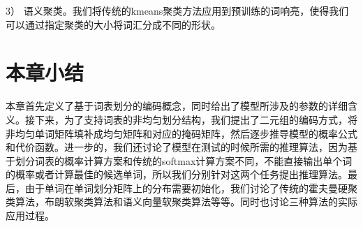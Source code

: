 3） 语义聚类。我们将传统的kmeans聚类方法应用到预训练的词响亮，使得我们可以通过指定聚类的大小将词汇分成不同的形状。

\section{本章小结}
本章首先定义了基于词表划分的编码概念，同时给出了模型所涉及的参数的详细含义。接下来，为了支持词表的非均匀划分结构，我们提出了二元组的编码方式，将非均匀单词矩阵填补成均匀矩阵和对应的掩码矩阵，然后逐步推导模型的概率公式和代价函数。进一步的，我们还讨论了模型在测试的时候所需的推理算法，因为基于划分词表的概率计算方案和传统的softmax计算方案不同，不能直接输出单个词的概率或者计算最佳的候选单词，所以我们分别针对这两个任务提出推理算法。最后，由于单词在单词划分矩阵上的分布需要初始化，我们讨论了传统的霍夫曼硬聚类算法，布朗软聚类算法和语义向量软聚类算法等等。同时也讨论三种算法的实际应用过程。